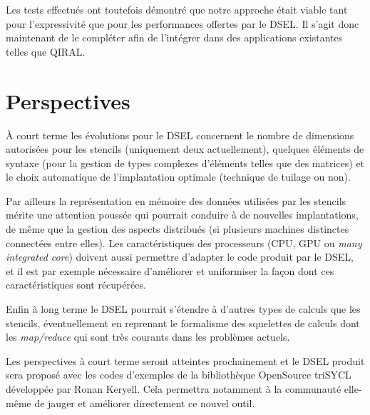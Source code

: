 Les tests effectués ont toutefois démontré que notre approche était viable tant pour l'expressivité que pour les performances offertes par le DSEL. Il s'agit donc maintenant de le compléter afin de l'intégrer dans des applications existantes telles que \textsf{QIRAL}.

\section{Perspectives}

À court terme les évolutions pour le DSEL concernent le nombre de dimensions autorisées pour les stencils (uniquement deux actuellement), quelques éléments de syntaxe (pour la gestion de types complexes d'éléments telles que des matrices) et le choix automatique de l'implantation optimale (technique de tuilage ou non).

Par ailleurs la représentation en mémoire des données utilisées par les stencils mérite une attention poussée qui pourrait conduire à de nouvelles implantations, de même que la gestion des aspects distribués (si plusieurs machines distinctes connectées entre elles). Les caractéristiques des  processeurs (CPU, GPU ou \emph{many integrated core}) doivent aussi permettre d'adapter le code produit par le DSEL, et il est par exemple nécessaire d'améliorer et uniformiser la façon dont ces caractéristiques sont récupérées.

Enfin à long terme le DSEL pourrait s'étendre à d'autres types de calculs que les stencils, éventuellement en reprenant le formalisme des squelettes de calculs dont les \emph{map/reduce} qui sont très courants dans les problèmes actuels.

Les perspectives à court terme seront atteintes prochainement et le DSEL produit sera proposé avec les codes d'exemples de la bibliothèque OpenSource \textsf{triSYCL} développée par Ronan Keryell. Cela permettra notamment à la communauté elle-même de jauger et améliorer directement ce nouvel outil. 

